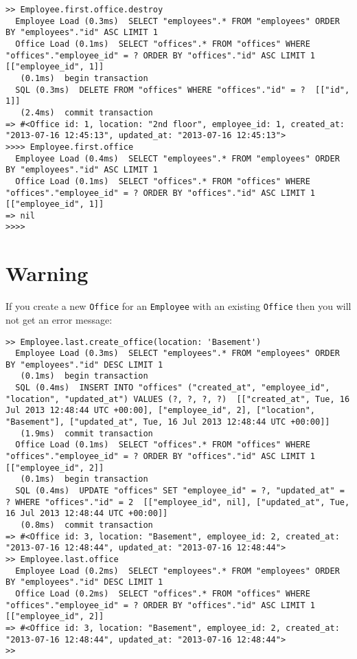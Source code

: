 \documentclass[a4paper]{book}
\begin{document}
\begin{shaded}\begin{verbatim}
>> Employee.first.office.destroy
  Employee Load (0.3ms)  SELECT "employees".* FROM "employees" ORDER BY "employees"."id" ASC LIMIT 1
  Office Load (0.1ms)  SELECT "offices".* FROM "offices" WHERE "offices"."employee_id" = ? ORDER BY "offices"."id" ASC LIMIT 1  [["employee_id", 1]]
   (0.1ms)  begin transaction
  SQL (0.3ms)  DELETE FROM "offices" WHERE "offices"."id" = ?  [["id", 1]]
   (2.4ms)  commit transaction
=> #<Office id: 1, location: "2nd floor", employee_id: 1, created_at: "2013-07-16 12:45:13", updated_at: "2013-07-16 12:45:13">
>>>> Employee.first.office
  Employee Load (0.4ms)  SELECT "employees".* FROM "employees" ORDER BY "employees"."id" ASC LIMIT 1
  Office Load (0.1ms)  SELECT "offices".* FROM "offices" WHERE "offices"."employee_id" = ? ORDER BY "offices"."id" ASC LIMIT 1  [["employee_id", 1]]
=> nil
>>>>
\end{verbatim}\end{shaded}

\section{Warning}\label{warning-4}

If you create a new \texttt{Office} for an \texttt{Employee} with an existing \texttt{Office} then you will not get an error message:

\begin{shaded}\begin{verbatim}
>> Employee.last.create_office(location: 'Basement')
  Employee Load (0.3ms)  SELECT "employees".* FROM "employees" ORDER BY "employees"."id" DESC LIMIT 1
   (0.1ms)  begin transaction
  SQL (0.4ms)  INSERT INTO "offices" ("created_at", "employee_id", "location", "updated_at") VALUES (?, ?, ?, ?)  [["created_at", Tue, 16 Jul 2013 12:48:44 UTC +00:00], ["employee_id", 2], ["location", "Basement"], ["updated_at", Tue, 16 Jul 2013 12:48:44 UTC +00:00]]
   (1.9ms)  commit transaction
  Office Load (0.1ms)  SELECT "offices".* FROM "offices" WHERE "offices"."employee_id" = ? ORDER BY "offices"."id" ASC LIMIT 1  [["employee_id", 2]]
   (0.1ms)  begin transaction
  SQL (0.4ms)  UPDATE "offices" SET "employee_id" = ?, "updated_at" = ? WHERE "offices"."id" = 2  [["employee_id", nil], ["updated_at", Tue, 16 Jul 2013 12:48:44 UTC +00:00]]
   (0.8ms)  commit transaction
=> #<Office id: 3, location: "Basement", employee_id: 2, created_at: "2013-07-16 12:48:44", updated_at: "2013-07-16 12:48:44">
>> Employee.last.office
  Employee Load (0.2ms)  SELECT "employees".* FROM "employees" ORDER BY "employees"."id" DESC LIMIT 1
  Office Load (0.2ms)  SELECT "offices".* FROM "offices" WHERE "offices"."employee_id" = ? ORDER BY "offices"."id" ASC LIMIT 1  [["employee_id", 2]]
=> #<Office id: 3, location: "Basement", employee_id: 2, created_at: "2013-07-16 12:48:44", updated_at: "2013-07-16 12:48:44">
>>
\end{verbatim}\end{shaded}
\end{document}
